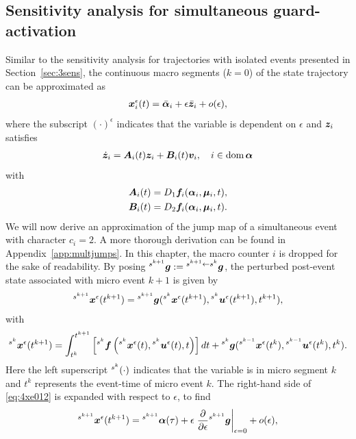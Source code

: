 \documentclass[../DC2017114Bouma.tex]{subfiles}
\begin{document}
\subsection{Sensitivity analysis for simultaneous guard-activation}
Similar to the sensitivity analysis for trajectories with isolated events presented in Section~\ref{sec:3sens}, the continuous macro segments ($k=0$) of the state trajectory can be approximated as
\begin{align}
{\boldsymbol{x}}_i^\epsilon(t) = \bar{\boldsymbol{\alpha}}_i + \epsilon\bar{{\boldsymbol{z}}}_i + o(\epsilon),
\end{align}
where the subscript $(\cdot)^\epsilon$ indicates that the variable is dependent on $\epsilon$ and ${\boldsymbol{z}}_i$ satisfies
\begin{align}
\dot{{\boldsymbol{z}}}_i = {\boldsymbol{A}}_i(t){\boldsymbol{z}}_i +{\boldsymbol{B}}_i(t){\boldsymbol{v}}_i,\quad i\in \operatorname{\textnormal{dom}}\boldsymbol{\alpha}
\end{align}
with
\begin{align*}
{\boldsymbol{A}}_i(t) &= D_1{\boldsymbol{f}}_i(\boldsymbol{\alpha}_i,\boldsymbol{\mu}_i,t),\\
{\boldsymbol{B}}_i(t) &= D_2{\boldsymbol{f}}_i(\boldsymbol{\alpha}_i,\boldsymbol{\mu}_i,t).
\end{align*}
We will now derive an approximation of the jump map of a simultaneous event with character $c_i = 2$. A more thorough derivation can be found in Appendix~\ref{app:multjumps}. In this chapter, the macro counter $i$ is dropped for the sake of readability. By posing $\hspace{0cm}^{s^{k+1}}{\boldsymbol{g}} := \hspace{0cm}^{s^{k+1}\leftarrow s^k}{\boldsymbol{g}}$, the perturbed post-event state associated with micro event $k+1$ is given by
\begin{align}
\hspace{0cm}^{s^{k+1}}{\boldsymbol{x}}^\epsilon(t^{k+1}) = \hspace{0cm}^{s^{k+1}}{\boldsymbol{g}}(\hspace{0cm}^{s^{k}}{\boldsymbol{x}}^\epsilon(t^{k+1}),\hspace{0cm}^{s^{k}}{\boldsymbol{u}}^\epsilon(t^{k+1}),t^{k+1}),\label{eq:4xe012}
\end{align}
with
\begin{align}
\hspace{0cm}^{s^{k}}{\boldsymbol{x}}^\epsilon(t^{k+1}) = \int_{t^{k}}^{t^{k+1}}\left[\hspace{0cm}^{s^{k}}{\boldsymbol{f}}\left(\hspace{0cm}^{s^{k}}{\boldsymbol{x}}^\epsilon(t),\hspace{0cm}^{s^{k}}{\boldsymbol{u}}^\epsilon(t),t\right)\right]dt + \hspace{0cm}^{s^{k}}{\boldsymbol{g}}(\hspace{0cm}^{s^{k-1}}{\boldsymbol{x}}^\epsilon(t^{k}),\hspace{0cm}^{s^{k-1}}{\boldsymbol{u}}^\epsilon(t^{k}),t^{k}).\label{eq:4xe01}
\end{align}
Here the left superscript $\hspace{0cm}^{s^k}(\cdot)$ indicates that the variable is in micro segment $k$ and $t^k$ represents the event-time of micro event $k$. The right-hand side of \eqref{eq:4xe012} is expanded with respect to $\epsilon$, to find
\begin{align}
\hspace{0cm}^{s^{k+1}}{\boldsymbol{x}}^\epsilon(t^{k+1}) = \hspace{0cm}^{s^{k+1}}\boldsymbol{\alpha}(\tau) + \epsilon\left.\frac{\partial}{\partial\epsilon}\hspace{0cm}^{s^{k+1}}{\boldsymbol{g}}\right|_{\epsilon=0} + o(\epsilon),\label{eq:4xe012exp}
\end{align}
\end{document}
